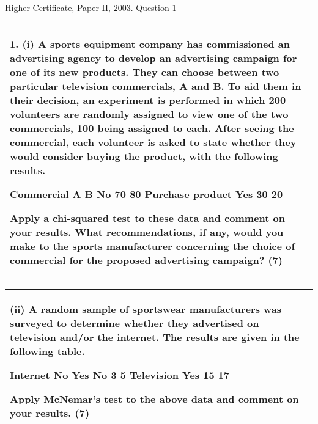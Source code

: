 \documentclass[a4paper,12pt]{article}
\begin{document}
Higher Certificate, Paper II, 2003. Question 1

\begin{table}[ht!]
 
\centering
 
\begin{tabular}{|p{15cm}|}
 
\hline  

 1. (i) A sports equipment company has commissioned an advertising agency to develop an advertising campaign for one of its new products.  They can choose between two particular television commercials, A and B.  To aid them in their decision, an experiment is performed in which 200 volunteers are randomly assigned to view one of the two commercials, 100 being assigned to each.  After seeing the commercial, each volunteer is asked to state whether they would consider buying the product, with the following results. 
 
  Commercial   A B No 70 80 Purchase product Yes 30 20 
 
 
Apply a chi-squared test to these data and comment on your results.  What recommendations, if any, would you make to the sports manufacturer concerning the choice of commercial for the proposed advertising campaign? (7) 

\\ \hline
  
\end{tabular}

\end{table}
\begin{table}[ht!]
 
\centering
 
\begin{tabular}{|p{15cm}|}
 
\hline  

(ii) A random sample of sportswear manufacturers was surveyed to determine whether they advertised on television and/or the internet.  The results are given in the following table. 
 
  Internet   No Yes No   3   5 Television Yes 15 17 
 
Apply McNemar's test to the above data and comment on your results. 
(7) 
\\ \hline
  
\end{tabular}

\end{table}
\end{document}
